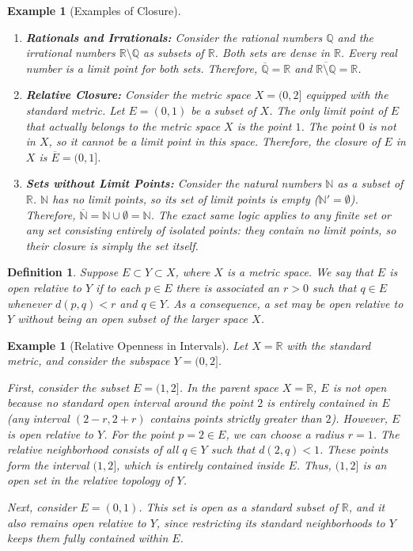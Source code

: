 \documentclass{article}
\theoremstyle{mythm}
\newtheorem{definition}[theorem]{Definition}
\newtheorem{example}[theorem]{Example}
\begin{document}
\begin{example}[Examples of Closure]
\begin{enumerate}
    \item \textbf{Rationals and Irrationals:} Consider the rational numbers $\mathbb{Q}$ and the irrational numbers $\mathbb{R} \setminus \mathbb{Q}$ as subsets of $\mathbb{R}$. Both sets are dense in $\mathbb{R}$. Every real number is a limit point for both sets. Therefore, $\overline{\mathbb{Q}} = \mathbb{R}$ and $\overline{\mathbb{R} \setminus \mathbb{Q}} = \mathbb{R}$.
    
    \item \textbf{Relative Closure:} Consider the metric space $X = (0, 2]$ equipped with the standard metric. Let $E = (0, 1)$ be a subset of $X$. The only limit point of $E$ that actually belongs to the metric space $X$ is the point $1$. The point $0$ is not in $X$, so it cannot be a limit point in this space. Therefore, the closure of $E$ in $X$ is $\overline{E} = (0, 1]$.
    
    \item \textbf{Sets without Limit Points:} Consider the natural numbers $\mathbb{N}$ as a subset of $\mathbb{R}$. $\mathbb{N}$ has no limit points, so its set of limit points is empty ($\mathbb{N}' = \emptyset$). Therefore, $\overline{\mathbb{N}} = \mathbb{N} \cup \emptyset = \mathbb{N}$. The exact same logic applies to any finite set or any set consisting entirely of isolated points: they contain no limit points, so their closure is simply the set itself.
\end{enumerate}
\end{example}
\begin{definition}
Suppose $E \subset Y \subset X$, where $X$ is a metric space. We say that $E$ is \textit{open relative to $Y$} if to each $p \in E$ there is associated an $r > 0$ such that $q \in E$ whenever $d(p, q) < r$ and $q \in Y$. As a consequence, a set may be open relative to $Y$ without being an open subset of the larger space $X$.
\end{definition}

\begin{example}[Relative Openness in Intervals]
Let $X = \mathbb{R}$ with the standard metric, and consider the subspace $Y = (0, 2]$. 

First, consider the subset $E = (1, 2]$. In the parent space $X = \mathbb{R}$, $E$ is not open because no standard open interval around the point $2$ is entirely contained in $E$ (any interval $(2-r, 2+r)$ contains points strictly greater than $2$). However, $E$ is open relative to $Y$. For the point $p = 2 \in E$, we can choose a radius $r = 1$. The relative neighborhood consists of all $q \in Y$ such that $d(2, q) < 1$. These points form the interval $(1, 2]$, which is entirely contained inside $E$. Thus, $(1, 2]$ is an open set in the relative topology of $Y$.

Next, consider $E = (0, 1)$. This set is open as a standard subset of $\mathbb{R}$, and it also remains open relative to $Y$, since restricting its standard neighborhoods to $Y$ keeps them fully contained within $E$.
\end{example}
\end{document}
